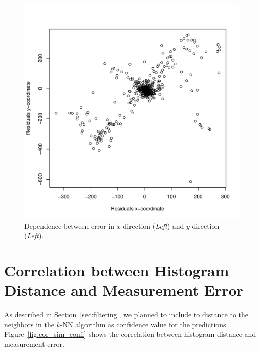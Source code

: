 \documentclass[11pt]{report}
\begin{document}
\begin{figure}[h!]
\begin{center}
\includegraphics[width=0.7\columnwidth]{measurement_model}
\caption{{\label{fig:measurementmodel}Dependence between error in $x$-direction
    (\emph{Left}) and $y$-direction (\emph{Left}).%
  }}
\end{center}
\end{figure}

\section{Correlation between Histogram Distance and Measurement Error}

As described in Section~\ref{sec:filtering}, we planned to include to
distance to the neighbors in the $k$-NN algorithm as confidence value
for the predictions. Figure~\ref{fig:cor_sim_confi} shows the
correlation between histogram distance and measurement error.
\end{document}
